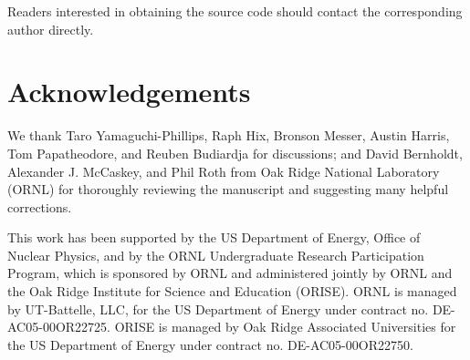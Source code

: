 \documentclass[]{elsart}
\begin{document}
Readers interested in obtaining the source code should contact the corresponding
author directly.

\section{Acknowledgements}

We thank Taro Yamaguchi-Phillips, Raph Hix, Bronson Messer, Austin Harris, Tom 
Papatheodore, and Reuben Budiardja for discussions; and David Bernholdt,
Alexander J. McCaskey, and Phil Roth from Oak Ridge National Laboratory (ORNL)
for thoroughly reviewing the manuscript and suggesting many helpful corrections.

This work has been supported by the US Department of Energy, Office of
Nuclear Physics, and by the ORNL Undergraduate Research Participation Program,
which is sponsored by ORNL and administered jointly by ORNL and the Oak Ridge
Institute for Science and Education (ORISE). ORNL is managed by UT-Battelle, LLC,
for the US Department of Energy under contract no. DE-AC05-00OR22725. ORISE
is managed by Oak Ridge Associated Universities for the US Department of
Energy under contract no. DE-AC05-00OR22750.


\clearpage
\end{document}
